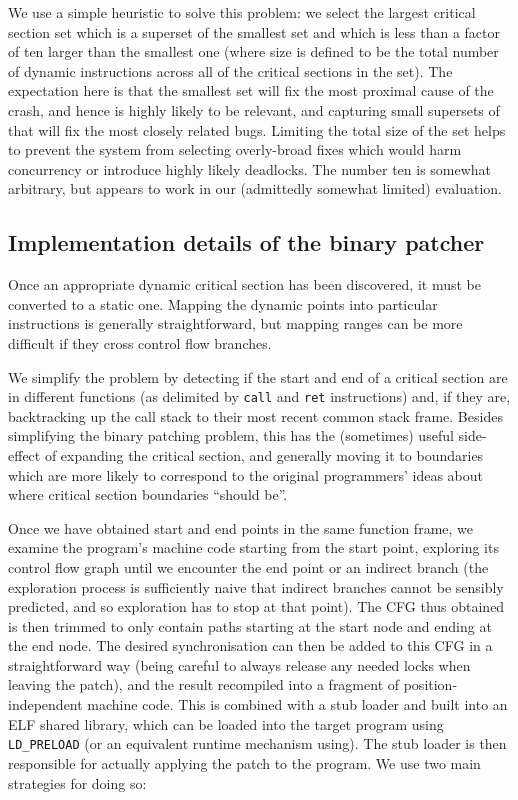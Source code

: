 \documentclass[10pt,a4paper,twocolumn]{article}
\begin{document}
We use a simple heuristic to solve this problem: we select the largest
critical section set which is a superset of the smallest set and which
is less than a factor of ten larger than the smallest one (where size
is defined to be the total number of dynamic instructions across all
of the critical sections in the set).  The expectation here is that
the smallest set will fix the most proximal cause of the crash, and
hence is highly likely to be relevant, and capturing small supersets
of that will fix the most closely related bugs.  Limiting the total
size of the set helps to prevent the system from selecting
overly-broad fixes which would harm concurrency or introduce highly
likely deadlocks.  The number ten is somewhat arbitrary, but appears
to work in our (admittedly somewhat limited) evaluation.

\subsection{Implementation details of the binary patcher}

Once an appropriate dynamic critical section has been discovered, it
must be converted to a static one.  Mapping the dynamic points into
particular instructions is generally straightforward, but mapping
ranges can be more difficult if they cross control flow branches.

We simplify the problem by detecting if the start and end of a
critical section are in different functions (as delimited by
\verb|call| and \verb|ret| instructions) and, if they are,
backtracking up the call stack to their most recent common stack
frame.  Besides simplifying the binary patching problem, this has the
(sometimes) useful side-effect of expanding the critical section, and
generally moving it to boundaries which are more likely to correspond
to the original programmers' ideas about where critical section
boundaries ``should be''.

Once we have obtained start and end points in the same function frame,
we examine the program's machine code starting from the start point,
exploring its control flow graph until we encounter the end point or
an indirect branch (the exploration process is sufficiently naive that
indirect branches cannot be sensibly predicted, and so exploration has
to stop at that point).  The CFG thus obtained is then trimmed to only
contain paths starting at the start node and ending at the end node.
The desired synchronisation can then be added to this CFG in a
straightforward way (being careful to always release any needed locks
when leaving the patch), and the result recompiled into a fragment of
position-independent machine code.  This is combined with a stub
loader and built into an ELF shared library, which can be loaded into
the target program using \verb|LD_PRELOAD| (or an equivalent runtime
mechanism using).  The stub loader is then responsible for actually
applying the patch to the program.  We use two main strategies for
doing so:
\end{document}
